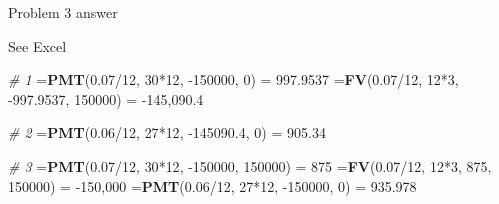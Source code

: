 \documentclass[ignorenonframetext,]{beamer}
\newenvironment{Shaded}{\begin{snugshade}}{\end{snugshade}}
\newcommand{\KeywordTok}[1]{\textcolor[rgb]{0.13,0.29,0.53}{\textbf{{#1}}}}
\newcommand{\DecValTok}[1]{\textcolor[rgb]{0.00,0.00,0.81}{{#1}}}
\newcommand{\FloatTok}[1]{\textcolor[rgb]{0.00,0.00,0.81}{{#1}}}
\newcommand{\StringTok}[1]{\textcolor[rgb]{0.31,0.60,0.02}{{#1}}}
\newcommand{\CommentTok}[1]{\textcolor[rgb]{0.56,0.35,0.01}{\textit{{#1}}}}
\newcommand{\NormalTok}[1]{{#1}}
\begin{document}
\begin{frame}[fragile]{Problem 3 answer}

\begin{Shaded}
\begin{Highlighting}[]
\NormalTok{See Excel}

\CommentTok{# 1}
\NormalTok{=}\KeywordTok{PMT}\NormalTok{(}\FloatTok{0.07}\NormalTok{/}\DecValTok{12}\NormalTok{, }\DecValTok{30}\NormalTok{*}\DecValTok{12}\NormalTok{, -}\DecValTok{150000}\NormalTok{, }\DecValTok{0}\NormalTok{) =}\StringTok{ }\FloatTok{997.9537}
\NormalTok{=}\KeywordTok{FV}\NormalTok{(}\FloatTok{0.07}\NormalTok{/}\DecValTok{12}\NormalTok{, }\DecValTok{12}\NormalTok{*}\DecValTok{3}\NormalTok{, -}\FloatTok{997.9537}\NormalTok{, }\DecValTok{150000}\NormalTok{) =}\StringTok{ }\NormalTok{-}\DecValTok{145}\NormalTok{,}\FloatTok{090.4}

\CommentTok{# 2}
\NormalTok{=}\KeywordTok{PMT}\NormalTok{(}\FloatTok{0.06}\NormalTok{/}\DecValTok{12}\NormalTok{, }\DecValTok{27}\NormalTok{*}\DecValTok{12}\NormalTok{, -}\FloatTok{145090.4}\NormalTok{, }\DecValTok{0}\NormalTok{) =}\StringTok{ }\FloatTok{905.34}

\CommentTok{# 3}
\NormalTok{=}\KeywordTok{PMT}\NormalTok{(}\FloatTok{0.07}\NormalTok{/}\DecValTok{12}\NormalTok{, }\DecValTok{30}\NormalTok{*}\DecValTok{12}\NormalTok{, -}\DecValTok{150000}\NormalTok{, }\DecValTok{150000}\NormalTok{) =}\StringTok{ }\DecValTok{875}
\NormalTok{=}\KeywordTok{FV}\NormalTok{(}\FloatTok{0.07}\NormalTok{/}\DecValTok{12}\NormalTok{, }\DecValTok{12}\NormalTok{*}\DecValTok{3}\NormalTok{, }\DecValTok{875}\NormalTok{, }\DecValTok{150000}\NormalTok{) =}\StringTok{ }\NormalTok{-}\DecValTok{150}\NormalTok{,}\DecValTok{000}
\NormalTok{=}\KeywordTok{PMT}\NormalTok{(}\FloatTok{0.06}\NormalTok{/}\DecValTok{12}\NormalTok{, }\DecValTok{27}\NormalTok{*}\DecValTok{12}\NormalTok{, -}\DecValTok{150000}\NormalTok{, }\DecValTok{0}\NormalTok{) =}\StringTok{ }\FloatTok{935.978}
\end{Highlighting}
\end{Shaded}

\end{frame}
\end{document}

